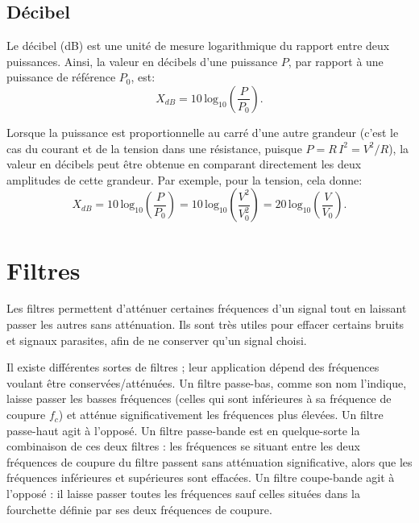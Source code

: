 \documentclass[canadien,12pt,oneside,letterpaper]{article}
\begin{document}
\subsection{Décibel}

Le décibel (dB) est une unité de mesure logarithmique du rapport entre deux puissances. Ainsi, la valeur en décibels d'une puissance $P$, par rapport à une puissance de référence $P_0$, est:
\begin{equation}
X_{dB}=10 \, \mathrm{log}_{10}\left( \frac{P}{P_0} \right).
\end{equation}

Lorsque la puissance est proportionnelle au carré d'une autre grandeur (c'est le cas du courant et de la tension dans une résistance, puisque $P=R\,I^2=V^2/R$), la valeur en décibels peut être obtenue en comparant directement les deux amplitudes de cette grandeur. Par exemple, pour la tension, cela donne:
\begin{equation}
X_{dB}=10 \, \mathrm{log}_{10}\left( \frac{P}{P_0} \right)=10 \, \mathrm{log}_{10}\left( \frac{V^2}{V_0^2} \right)=20 \, \mathrm{log}_{10}\left( \frac{V}{V_0} \right).
\end{equation}


\section{Filtres}

Les filtres permettent d'atténuer certaines fréquences d'un signal tout en laissant passer les autres sans atténuation. Ils sont très utiles pour effacer certains bruits et signaux parasites, afin de ne conserver qu'un signal choisi.

Il existe différentes sortes de filtres ; leur application dépend des fréquences voulant être conservées/atténuées. Un filtre passe-bas, comme son nom l'indique, laisse passer les basses fréquences (celles qui sont inférieures à sa fréquence de coupure $f_c$) et atténue significativement les fréquences plus élevées. Un filtre passe-haut agit à l'opposé. Un filtre passe-bande est en quelque-sorte la combinaison de ces deux filtres : les fréquences se situant entre les deux fréquences de coupure du filtre passent sans atténuation significative, alors que les fréquences inférieures et supérieures sont effacées. Un filtre coupe-bande agit à l'opposé : il laisse passer toutes les fréquences sauf celles situées dans la fourchette définie par ses deux fréquences de coupure.
\end{document}
